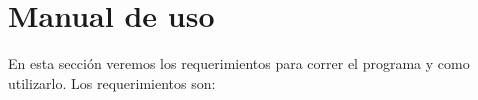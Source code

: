 \section{Manual de uso}
En esta sección veremos los requerimientos para correr el programa y como utilizarlo. Los requerimientos son:


